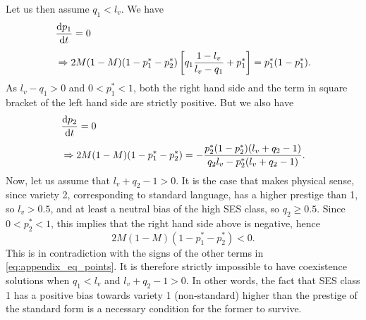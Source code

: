 \documentclass[../thesis.tex]{subfiles}
\begin{document}
Let us then assume $q_1 < l_v$. We have
\begin{equation}
    \label{eq:appendix_eq_points}
    \begin{aligned}
        & \dv{p_1}{t} = 0
        \\[1ex]
        & \Rightarrow 2 M (1 - M) (1 - p_1^* - p_2^*) \left[q_1 \frac{1 - l_v}{l_v - q_1} + p_1^* \right] = p_1^* (1 - p_1^*).
    \end{aligned}
\end{equation}
As $l_v - q_1 > 0$ and $0 < p_1^* < 1$, both the right hand side and the term in square
bracket of the left hand side are strictly positive. But we also have
\begin{equation}
    \begin{aligned}
        & \dv{p_2}{t} = 0
        \\[1ex]
        & \Rightarrow 2 M (1 - M) (1 - p_1^* - p_2^*)
            = - \frac{p_2^* (1 - p_2^*) (l_v + q_2 - 1)}{q_2 l_v - p_2^* (l_v + q_2 - 1)}.
    \end{aligned}
\end{equation}
Now, let us assume that $l_v + q_2 - 1 > 0$. It is the case that makes physical sense,
since variety 2, corresponding to standard language, has a higher prestige than 1, so
$l_v > 0.5$, and at least a neutral bias of the high \ac{SES} class, so $q_2 \geq 0.5$.
Since $0 < p_2^* < 1$, this implies that the right hand side above is negative, hence 
\begin{equation}
    2 M (1 - M) (1 - p_1^* - p_2^*) < 0.
\end{equation}
This is in contradiction with the signs of the other terms in
\cref{eq:appendix_eq_points}. It is therefore strictly impossible to have coexistence
solutions when $q_1 < l_v$ and $l_v + q_2 - 1 > 0$. In other words, the fact that
\ac{SES} class 1 has a positive bias towards variety 1 (non-standard) higher than the
prestige of the standard form is a necessary condition for the former to survive. 
\end{document}
